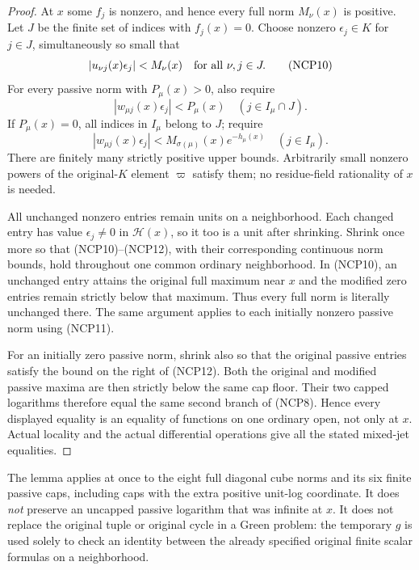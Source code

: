 \begin{proof}
At $x$ some $f_j$ is nonzero, and hence every full norm $M_\nu(x)$
is positive.  Let $J$ be the finite set of indices with $f_j(x)=0$.
Choose nonzero $\epsilon_j\in K$ for $j\in J$, simultaneously so
small that
\[
 |u_{\nu j}(x)\epsilon_j|<M_\nu(x)
       \quad\hbox{for all }\nu,j\in J.
 \tag{NCP10}
\]
For every passive norm with $P_\mu(x)>0$, also require
\[
 |w_{\mu j}(x)\epsilon_j|<P_\mu(x)
                   \quad(j\in I_\mu\cap J).
 \tag{NCP11}
\]
If $P_\mu(x)=0$, all indices in $I_\mu$ belong to $J$; require
\[
 |w_{\mu j}(x)\epsilon_j|
   <M_{\sigma(\mu)}(x)e^{-h_\mu(x)}
                   \quad(j\in I_\mu).
 \tag{NCP12}
\]
There are finitely many strictly positive upper bounds.  Arbitrarily
small nonzero powers of the original-$K$ element $\varpi$ satisfy
them; no residue-field rationality of $x$ is needed.

All unchanged nonzero entries remain units on a neighborhood.
Each changed entry has value $\epsilon_j\ne0$ in $\mathscr H(x)$,
so it too is a unit after shrinking.  Shrink once more so that
(NCP10)--(NCP12), with their corresponding continuous norm bounds,
hold throughout one common ordinary neighborhood.  In (NCP10), an
unchanged entry attains the original full maximum near $x$ and the
modified zero entries remain strictly below that maximum.  Thus
every full norm is literally unchanged there.  The same argument
applies to each initially nonzero passive norm using (NCP11).

For an initially zero passive norm, shrink also so that the original
passive entries satisfy the bound on the right of (NCP12).  Both the
original and modified passive maxima are then strictly below the
same cap floor.  Their two capped logarithms therefore equal the
same second branch of (NCP8).  Hence every displayed equality is
an equality of functions on one ordinary open, not only at $x$.
Actual locality and the actual differential operations give all
the stated mixed-jet equalities.
\end{proof}

The lemma applies at once to the eight full diagonal cube norms
and its six finite passive caps, including caps with the extra
positive unit-log coordinate.  It does \emph{not} preserve an
uncapped passive logarithm that was infinite at $x$.  It does not
replace the original tuple or original cycle in a Green problem:
the temporary $g$ is used solely to check an identity between the
already specified original finite scalar formulas on a neighborhood.

